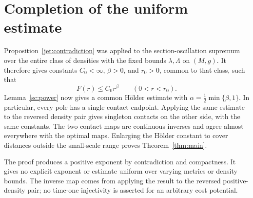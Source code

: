 \section{Completion of the uniform estimate}
\label{sec:conclusion}

Proposition~\ref{jet:contradiction} was applied to the section-oscillation
supremum over the entire class of densities with the fixed bounds
$\lambda,\Lambda$ on $(M,g)$. It therefore gives constants
$C_0<\infty$, $\beta>0$, and $r_0>0$, common to that class, such that
\[
 F(r)\le C_0r^\beta\qquad(0<r<r_0).
\]
Lemma~\ref{sc:power} now gives a common H\"older estimate with
$\alpha=\tfrac12\min\{\beta,1\}$. In particular, every pole has a
single contact endpoint. Applying the same estimate to the reversed
density pair gives singleton contacts on the other side, with the same
constants. The two contact maps are continuous inverses and agree
almost everywhere with the optimal maps. Enlarging the H\"older constant
to cover distances outside the small-scale range proves
Theorem~\ref{thm:main}.

\begin{remark}
The proof produces a positive exponent by contradiction and compactness.
It gives no explicit exponent or estimate uniform over varying metrics
or density bounds. The inverse map comes from applying the result to the
reversed positive-density pair; no time-one injectivity is asserted for
an arbitrary cost potential.
\end{remark}
